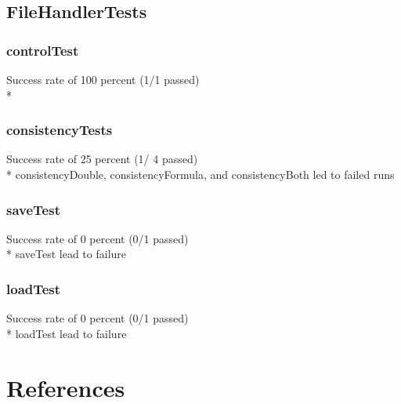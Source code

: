 \documentclass[12pt]{article}
\begin{document}
\subsection{FileHandlerTests}
\subsubsection{controlTest}
Success rate of 100 percent (1/1 passed) \\*
\subsubsection{consistencyTests}
Success rate of 25 percent (1/ 4 passed) \\*
consistencyDouble, consistencyFormula, and consistencyBoth led to failed runs 

\subsubsection{saveTest}
Success rate of 0 percent (0/1 passed) \\*
saveTest lead to failure

\subsubsection{loadTest}
Success rate of 0 percent (0/1 passed) \\*
loadTest lead to failure

\section{References}

\printindex
\end{document}
